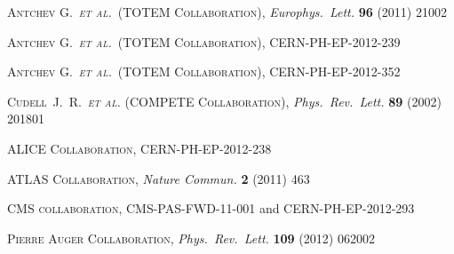 \documentclass[TOTEM]{cern/cernphprep}
\def\un#1{\,{\rm #1}}
\def\Name#1{\textsc{#1}, }
\def\REVIEW#1#2#3#4{{\it #1} {\bf #2} (#3) #4}
\begin{document}
\begin{thebibliography}{00}

	\Name{Antchev G.~{\it et al.}~(TOTEM Collaboration)}
	\REVIEW{Europhys.~Lett.}{96}{2011}{21002}

	\Name{Antchev G.~{\it et al.}~(TOTEM Collaboration)}
	CERN-PH-EP-2012-239

	\Name{Antchev G.~{\it et al.}~(TOTEM Collaboration)}
	CERN-PH-EP-2012-352



	\Name{Cudell~J.~R.~{\it et al.} (COMPETE Collaboration)}
	\REVIEW{Phys.\ Rev.\ Lett.}{89}{2002}{201801}

	\Name{ALICE Collaboration}
	CERN-PH-EP-2012-238

	\Name{ATLAS Collaboration}
	\REVIEW{Nature Commun.}{2}{2011}{463}

	\Name{CMS collaboration}
	CMS-PAS-FWD-11-001 and
	CERN-PH-EP-2012-293

	\Name{Pierre Auger Collaboration}
	\REVIEW{Phys.\ Rev.\ Lett.}{109}{2012}{062002}


\end{thebibliography}
\end{document}

